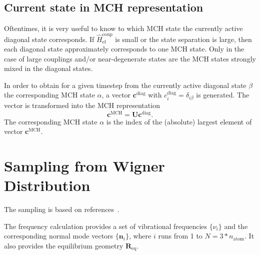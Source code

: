 \documentclass[a4paper,11pt,DIV=15,openany,twoside=false]{scrbook}
\newcommand{\VEC}[1]{\ensuremath{\mathbf{#1}}}
\begin{document}
\subsection{Current state in MCH representation}\label{ssec:state_transform}

Oftentimes, it is very useful to know to which MCH state the currently active diagonal state corresponds. If $\hat{H}_{\text{el}}^{\text{coup}}$ is small or the state separation is large, then each diagonal state approximately corresponds to one MCH state. Only in the case of large couplings and/or near-degenerate states are the MCH states strongly mixed in the diagonal states.

In order to obtain for a given timestep from the currently active diagonal state $\beta$ the corresponding MCH state $\alpha$, a vector $\VEC{c}^\text{diag}$ with $c_i^\text{diag}=\delta_{i\beta}$ is generated. The vector is transformed into the MCH representation
\begin{equation}
  \VEC{c}^\text{MCH}=\VEC{U}\VEC{c}^\text{diag}.
\end{equation}
The corresponding MCH state $\alpha$ is the index of the (absolute) largest element of vector $\VEC{c}^\text{MCH}$.


\section{Sampling from Wigner Distribution}\label{met:wigner}

The sampling is based on references~\cite{Dahl1988JCP, Schinke1995}.

The frequency calculation provides a set of vibrational frequencies $\{\nu_i\}$ and the corresponding normal mode vectors $\{\VEC{n}_i\}$, where $i$ runs from 1 to $N=3*n_{\text{atom}}$. It also provides the equilibrium geometry $\VEC{R}_{\text{eq}}$.
\end{document}
